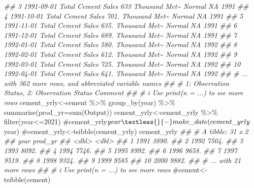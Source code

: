 \documentclass[
  letterpaper,
  DIV=11,
  numbers=noendperiod]{scrartcl}
\newenvironment{Shaded}{\begin{snugshade}}{\end{snugshade}}
\newcommand{\AttributeTok}[1]{\textcolor[rgb]{0.40,0.45,0.13}{#1}}
\newcommand{\CommentTok}[1]{\textcolor[rgb]{0.37,0.37,0.37}{#1}}
\newcommand{\DecValTok}[1]{\textcolor[rgb]{0.68,0.00,0.00}{#1}}
\newcommand{\DocumentationTok}[1]{\textcolor[rgb]{0.37,0.37,0.37}{\textit{#1}}}
\newcommand{\FunctionTok}[1]{\textcolor[rgb]{0.28,0.35,0.67}{#1}}
\newcommand{\NormalTok}[1]{\textcolor[rgb]{0.00,0.23,0.31}{#1}}
\newcommand{\OtherTok}[1]{\textcolor[rgb]{0.00,0.23,0.31}{#1}}
\newcommand{\SpecialCharTok}[1]{\textcolor[rgb]{0.37,0.37,0.37}{#1}}
\begin{document}
\begin{Shaded}
\begin{Highlighting}[]
\DocumentationTok{\#\#  3 1991{-}09{-}01 Total Cement Sales   633  Thousand Met\textasciitilde{} Normal  NA       1991}
\DocumentationTok{\#\#  4 1991{-}10{-}01 Total Cement Sales   701. Thousand Met\textasciitilde{} Normal  NA       1991}
\DocumentationTok{\#\#  5 1991{-}11{-}01 Total Cement Sales   635. Thousand Met\textasciitilde{} Normal  NA       1991}
\DocumentationTok{\#\#  6 1991{-}12{-}01 Total Cement Sales   689. Thousand Met\textasciitilde{} Normal  NA       1991}
\DocumentationTok{\#\#  7 1992{-}01{-}01 Total Cement Sales   580. Thousand Met\textasciitilde{} Normal  NA       1992}
\DocumentationTok{\#\#  8 1992{-}02{-}01 Total Cement Sales   612. Thousand Met\textasciitilde{} Normal  NA       1992}
\DocumentationTok{\#\#  9 1992{-}03{-}01 Total Cement Sales   725. Thousand Met\textasciitilde{} Normal  NA       1992}
\DocumentationTok{\#\# 10 1992{-}04{-}01 Total Cement Sales   641. Thousand Met\textasciitilde{} Normal  NA       1992}
\DocumentationTok{\#\# \# ... with 362 more rows, and abbreviated variable names}
\DocumentationTok{\#\# \#   1: \textasciigrave{}Observation Status\textasciigrave{}, 2: \textasciigrave{}Observation Status Comment\textasciigrave{}}
\DocumentationTok{\#\# \# i Use \textasciigrave{}print(n = ...)\textasciigrave{} to see more rows}
\NormalTok{cement\_yrly}\OtherTok{\textless{}{-}}\NormalTok{cement }\SpecialCharTok{\%\textgreater{}\%} \FunctionTok{group\_by}\NormalTok{(year) }\SpecialCharTok{\%\textgreater{}\%} \FunctionTok{summarise}\NormalTok{(}\AttributeTok{prod\_yr=}\FunctionTok{sum}\NormalTok{(Output))}
\NormalTok{cement\_yrly}\OtherTok{\textless{}{-}}\NormalTok{cement\_yrly }\SpecialCharTok{\%\textgreater{}\%} \FunctionTok{filter}\NormalTok{(year}\SpecialCharTok{\textless{}=}\DecValTok{2021}\NormalTok{)}
\CommentTok{\#cement\_yrly$year\textless{}{-}make\_date(cement\_yrly$year)}
\CommentTok{\#cement\_yrly\textless{}{-}tsibble(cement\_yrly)}
\NormalTok{cement\_yrly}
\DocumentationTok{\#\# \# A tibble: 31 x 2}
\DocumentationTok{\#\#     year prod\_yr}
\DocumentationTok{\#\#    \textless{}dbl\textgreater{}   \textless{}dbl\textgreater{}}
\DocumentationTok{\#\#  1  1991   3890.}
\DocumentationTok{\#\#  2  1992   7504.}
\DocumentationTok{\#\#  3  1993   8092.}
\DocumentationTok{\#\#  4  1994   7746.}
\DocumentationTok{\#\#  5  1995   8992.}
\DocumentationTok{\#\#  6  1996   9658.}
\DocumentationTok{\#\#  7  1997   9519.}
\DocumentationTok{\#\#  8  1998   9324.}
\DocumentationTok{\#\#  9  1999   9585 }
\DocumentationTok{\#\# 10  2000   9882.}
\DocumentationTok{\#\# \# ... with 21 more rows}
\DocumentationTok{\#\# \# i Use \textasciigrave{}print(n = ...)\textasciigrave{} to see more rows}
\CommentTok{\#cement\textless{}{-}tsibble(cement)}
\end{Highlighting}
\end{Shaded}
\end{document}
